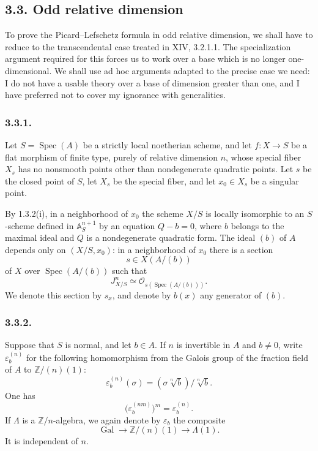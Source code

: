\subsection*{3.3. Odd relative dimension}

To prove the Picard--Lefschetz formula in odd relative dimension, we
shall have to reduce to the transcendental case treated in XIV,
3.2.1.1.  The specialization argument required for this forces us to
work over a base which is no longer one-dimensional.  We shall use
ad hoc arguments adapted to the precise case we need: I do not have
a usable theory over a base of dimension greater than one, and I have
preferred not to cover my ignorance with generalities.

\subsubsection*{3.3.1.}
Let $S=\operatorname{Spec}(A)$ be a strictly local noetherian scheme,
and let $f:X\to S$ be a flat morphism of finite type, purely of
relative dimension $n$, whose special fiber $X_s$ has no nonsmooth
points other than nondegenerate quadratic points.  Let $s$ be the
closed point of $S$, let $X_s$ be the special fiber, and let
$x_0\in X_s$ be a singular point.

By 1.3.2(i), in a neighborhood of $x_0$ the scheme $X/S$ is locally
isomorphic to an $S$-scheme defined in $\mathbb A^{n+1}_S$ by an
equation $Q-b=0$, where $b$ belongs to the maximal ideal and $Q$ is a
nondegenerate quadratic form.  The ideal $(b)$ of $A$ depends only
on $(X/S,x_0)$: in a neighborhood of $x_0$ there is a section
\[
s\in X(A/(b))
\]
of $X$ over $\operatorname{Spec}(A/(b))$ such that
\[
J^n_{X/S}\simeq
\mathcal O_{s(\operatorname{Spec}(A/(b)))}.
\]
We denote this section by $s_x$, and denote by $b(x)$ any generator
of $(b)$.

\subsubsection*{3.3.2.}
Suppose that $S$ is normal, and let $b\in A$.  If $n$ is invertible
in $A$ and $b\ne0$, write $\varepsilon_b^{(n)}$ for the following
homomorphism from the Galois group of the fraction field of $A$ to
$\mathbb Z/(n)(1)$:
\[
\varepsilon_b^{(n)}(\sigma)
= (\sigma\sqrt[n]{b})/\sqrt[n]{b}.
\]
One has
\[
\bigl(\varepsilon_b^{(nm)}\bigr)^m=\varepsilon_b^{(n)}.
\]
If $\Lambda$ is a $\mathbb Z/n$-algebra, we again denote by
$\varepsilon_b$ the composite
\[
\operatorname{Gal}\longrightarrow\mathbb Z/(n)(1)
\longrightarrow\Lambda(1).
\]
It is independent of $n$.

